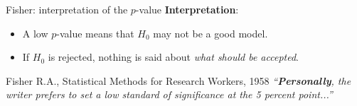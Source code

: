 \documentclass[aspectratio=169]{beamer}
\begin{document}
\begin{frame}{Fisher: interpretation of the $p$-value}
  \textbf{Interpretation}:
  \begin{itemize}
  \item A low $p$-value means that $H_0$ may not be a good model.
  \item If $H_0$ is rejected, nothing is said about \emph{what should
      be accepted}.
  \end{itemize}
  \begin{block}{Fisher R.A., Statistical Methods for Research Workers, 1958}
    \emph{``\textbf{Personally}, the writer prefers to set a low standard of
      significance at the 5 percent point...''}
  \end{block}
\end{frame}
\end{document}
